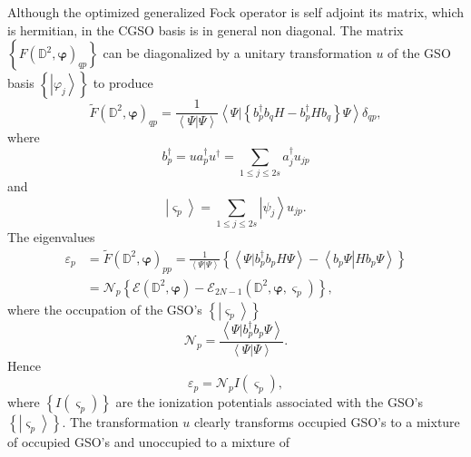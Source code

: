 \documentclass[aps,preprint]{revtex4}%
\begin{document}
Although the optimized generalized Fock operator is self adjoint its matrix,
which is hermitian, in the CGSO basis is in general non diagonal. The matrix
$\left\{  F\left(  \mathbb{D}^{2},\bm{\varphi}\right)  _{qp}\right\}  $ can be
diagonalized by a unitary transformation $u$ of the GSO basis $\left\{
\left\vert \varphi_{j}\right\rangle \right\}  $ to produce
\begin{equation}
\tilde{F}\left(  \mathbb{D}^{2},\bm{\varphi}\right)  _{qp}=\frac
{1}{\left\langle \left.  \Psi\right\vert \Psi\right\rangle }\left\langle
\left.  \Psi\right\vert \left\{  b_{p}^{\dagger}b_{q}H-b_{p}^{\dagger}%
Hb_{q}\right\}  \Psi\right\rangle \delta_{qp},
\end{equation}
where
\begin{equation}
b_{p}^{\dagger}=ua_{p}^{\dagger}u^{\dagger}=\sum_{1\leq j\leq2s}a_{j}%
^{\dagger}u_{jp}%
\end{equation}
and
\begin{equation}
\left\vert \varsigma_{p}\right\rangle =\sum_{1\leq j\leq2s}\left\vert \psi
_{j}\right\rangle u_{jp}.
\end{equation}
The eigenvalues
\begin{align}
\varepsilon_{p}  &  =\tilde{F}\left(  \mathbb{D}^{2},\bm{\varphi}\right)
_{pp}=\frac{1}{\left\langle \left.  \Psi\right\vert \Psi\right\rangle
}\left\{  \left\langle \left.  \Psi\right\vert b_{p}^{\dagger}b_{p}%
H\Psi\right\rangle -\left\langle \left.  b_{p}\Psi\right\vert Hb_{p}%
\Psi\right\rangle \right\} \nonumber\\
&  =\mathcal{N}_{p}\left\{  \mathcal{E}\left(  \mathbb{D}^{2}%
,\bm{\varphi }\right)  -\mathcal{E}_{2N-1}\left(  \mathbb{D}^{2}%
,\bm{\varphi,}\varsigma_{p}\right)  \right\}  ,
\end{align}
where the occupation of the GSO's $\left\{  \left\vert \varsigma
_{p}\right\rangle \right\}  $
\begin{equation}
\mathcal{N}_{p}=\frac{\left\langle \left.  \Psi\right\vert b_{p}^{\dagger
}b_{p}\Psi\right\rangle }{\left\langle \left.  \Psi\right\vert \Psi
\right\rangle }.
\end{equation}
Hence
\begin{equation}
\varepsilon_{p}=\mathcal{N}_{p}I\left(  \varsigma_{p}\right)  ,
\end{equation}
where $\left\{  I\left(  \varsigma_{p}\right)  \right\}  $ are the ionization
potentials associated with the GSO's $\left\{  \left\vert \varsigma
_{p}\right\rangle \right\}  .$ The transformation $u$ clearly transforms
occupied GSO's to a mixture of occupied GSO's and unoccupied to a mixture of
\end{document}
